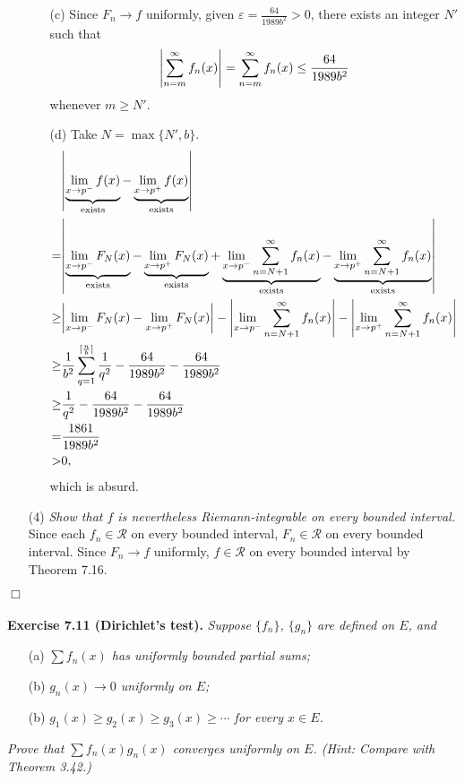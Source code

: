 \documentclass{article}
\begin{document}
\begin{enumerate}
\begin{enumerate}
  \item[(c)]
  Since $F_n \to f$ uniformly, given $\varepsilon = \frac{64}{1989 b^2} > 0$,
  there exists an integer $N'$ such that
  \[
    \abs{ \sum_{n=m}^{\infty} f_n(x) }
    = \sum_{n=m}^{\infty} f_n(x)
    \leq \frac{64}{1989 b^2}
  \]
  whenever $m \geq N'$.

  \item[(d)]
  Take $N = \max\{N', b\}$.
  \begin{align*}
    &\abs{ \underbrace{\lim_{x \to p^{-}} f(x)}_{\text{exists}}
      - \underbrace{\lim_{x \to p^{+}} f(x)}_{\text{exists}} } \\
    =& \abs{
      \underbrace{\lim_{x \to p^{-}} F_N(x)}_{\text{exists}}
      - \underbrace{\lim_{x \to p^{+}} F_N(x)}_{\text{exists}}
      + \underbrace{\lim_{x \to p^{-}} \sum_{n=N+1}^{\infty} f_n(x)}_{\text{exists}}
      - \underbrace{\lim_{x \to p^{+}} \sum_{n=N+1}^{\infty} f_n(x)}_{\text{exists}} } \\
    \geq& \abs{ \lim_{x \to p^{-}} F_N(x) - \lim_{x \to p^{+}} F_N(x) }
      - \abs{  \lim_{x \to p^{-}} \sum_{n=N+1}^{\infty} f_n(x) }
      - \abs{  \lim_{x \to p^{+}} \sum_{n=N+1}^{\infty} f_n(x) } \\
    \geq& \frac{1}{b^2} \sum_{q = 1}^{[\frac{n}{b}]} \frac{1}{q^2}
      - \frac{64}{1989 b^2} - \frac{64}{1989 b^2} \\
    \geq& \frac{1}{q^2} - \frac{64}{1989 b^2} - \frac{64}{1989 b^2} \\
    =& \frac{1861}{1989 b^2} \\
    >& 0,
  \end{align*}
  which is absurd.
  \end{enumerate}

  \item[(4)]
  \emph{Show that $f$ is nevertheless Riemann-integrable on every bounded interval.}
  Since each $f_n \in \mathscr{R}$ on every bounded interval,
  $F_n \in \mathscr{R}$ on every bounded interval.
  Since $F_n \to f$ uniformly,
  $f \in \mathscr{R}$ on every bounded interval by Theorem 7.16.
\end{enumerate}
$\Box$ \\\\






\textbf{Exercise 7.11 (Dirichlet's test).}
\emph{Suppose $\{f_n\}$, $\{g_n\}$ are defined on $E$, and}
\begin{enumerate}
  \item[(a)]
  \emph{$\sum f_n(x)$ has uniformly bounded partial sums;}
  \item[(b)]
  \emph{$g_n(x) \to 0$ uniformly on $E$;}
  \item[(b)]
  \emph{$g_1(x) \geq g_2(x) \geq g_3(x) \geq \cdots$ for every $x \in E$.}
\end{enumerate}
\emph{Prove that $\sum f_n(x) g_n(x)$ converges uniformly on $E$.
(Hint: Compare with Theorem 3.42.)} \\
\end{document}

